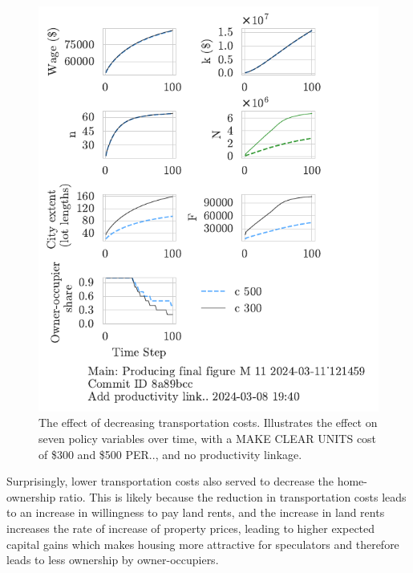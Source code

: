 \begin{figure}[h!b]
    \centering
    \includegraphics[scale=1, trim={0 1.4cm 0 0},clip]{fig/c-Main-121459.pdf}
    \caption[The effect of decreasing transportation costs]{The effect of decreasing transportation costs. Illustrates the effect on seven policy variables over time, with a {\color{red} MAKE CLEAR UNITS cost of \$300 and \$500 PER..}, and no productivity linkage.}
    \label{fig:c_ownership_trajectory}
\end{figure}


Surprisingly, lower transportation costs also served to decrease the home-ownership ratio. This is likely because the reduction in transportation costs leads to an increase in willingness to pay land rents, and the increase in land rents increases the rate of increase of property prices, leading to higher expected capital gains which makes housing more attractive for speculators and therefore leads to less ownership by owner-occupiers. 



\newpage


